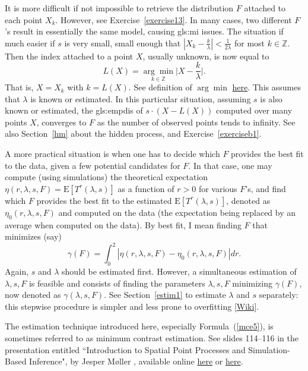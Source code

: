 \documentclass[10pt]{article}
\begin{document}
It is more difficult if not impossible to retrieve the distribution $F$ attached to each point $X_k$. However, see Exercise~\ref{exercise13}. In many cases,
two different $F$'s result in essentially the same model, causing \gls{gls:mi} issues.
The situation if much easier if $s$ is very small, small enough that $|X_k - \frac{k}{\lambda}| < \frac{1}{2\lambda}$ for most $k\in\mathbb{Z}$.
Then the index attached to a point $X$, usually unknown, is now equal to 
$$L(X)=\underset{k\in\mathbb{Z}}{\arg\min} \Big|X - \frac{k}{\lambda}\Big|.$$ 
That is, $X=X_k$ with $k=L(X)$. See definition of $\arg\min$ \href{https://en.wikipedia.org/wiki/Arg_max}{here}. This assumes that $\lambda$ is known or estimated.
In this particular situation, assuming $s$ is also known or estimated, the  \gls{gls:empdis} of $s\cdot (X-L(X))$
computed over many points $X$, converges to $F$ as the number of observed points tends to infinity. See also Section~\ref{hm} about the 
\textcolor{index}{hidden process}, and Exercise~\ref{exerciseb1}.

A more practical situation is when one has to decide which $F$ provides the best fit to the data, given a few potential candidates for $F$.  In that case, one may compute (using simulations) the theoretical expectation $\eta(r,\lambda,s, F)=\mbox{E}[T^r(\lambda,s)]$ as a function of $r>0$ for various $F$'s, and find which $F$ provides the best fit to
the estimated $\mbox{E}[T^r(\lambda,s)]$, denoted as  $\eta_0(r,\lambda,s, F)$ and computed on the data (the expectation being replaced by an average when computed on the data). By best fit, I mean finding $F$ that minimizes (say)
\begin{equation}
\gamma(F)=\int_{0}^2 |\eta(r,\lambda,s, F) - \eta_0(r,\lambda,s, F)| dr. \label{mce5}
\end{equation}
\noindent Again, $s$ and $\lambda$ should be estimated first. However, a simultaneous estimation of $\lambda,s,F$ is feasible and consists of finding the parameters
$\lambda,s,F$ minimizing $\gamma(F)$, now denoted as $\gamma(\lambda,s,F)$. See Section~\ref{estim1} to estimate $\lambda$ and $s$ separately: this
stepwise procedure is simpler and less prone to \textcolor{index}{overfitting} [\href{https://en.wikipedia.org/wiki/Overfitting}{Wiki}].

The estimation technique introduced here, especially Formula~(\ref{mce5}),  is sometimes referred to as \textcolor{index}{minimum contrast estimation}.
See slides 114--116 in the presentation entitled ``Introduction to Spatial Point Processes and Simulation-Based Inference",
by Jesper Møller \cite{momo55}, available online \href{https://cimpatogo2018.sciencesconf.org/data/pages/Handout_Moller_CIMPA_Togo_2018.pdf}{here}
 or \href{https://drive.google.com/file/d/1y5TZXvAL8fP9G5UkmV3npKgoVB0YWtXk/view?usp=sharing}{here}. 
\end{document}
